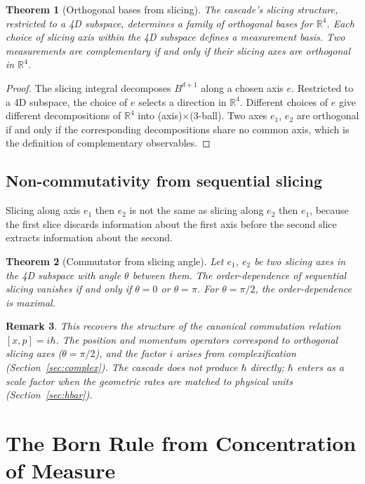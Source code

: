 \documentclass[12pt,a4paper]{article}
\newtheorem{theorem}{Theorem}[section]
\newtheorem{remark}[theorem]{Remark}
\begin{document}
\begin{theorem}[Orthogonal bases from slicing]\label{thm:bases}
The cascade's slicing structure, restricted to a 4D subspace, determines a family of
orthogonal bases for $\mathbb{R}^4$. Each choice of slicing axis within the 4D subspace
defines a measurement basis. Two measurements are complementary if and only if their slicing
axes are orthogonal in $\mathbb{R}^4$.
\end{theorem}
\begin{proof}
The slicing integral decomposes $B^{d+1}$ along a chosen axis $e$. Restricted to a 4D
subspace, the choice of $e$ selects a direction in $\mathbb{R}^4$. Different choices of $e$
give different decompositions of $\mathbb{R}^4$ into (axis)$\times$(3-ball). Two axes $e_1$,
$e_2$ are orthogonal if and only if the corresponding decompositions share no common axis,
which is the definition of complementary observables.
\end{proof}

\subsection{Non-commutativity from sequential slicing}

Slicing along axis $e_1$ then $e_2$ is not the same as slicing along $e_2$ then $e_1$,
because the first slice discards information about the first axis before the second slice
extracts information about the second.

\begin{theorem}[Commutator from slicing angle]\label{thm:commutator}
Let $e_1$, $e_2$ be two slicing axes in the 4D subspace with angle $\theta$ between them.
The order-dependence of sequential slicing vanishes if and only if $\theta=0$ or $\theta=\pi$.
For $\theta=\pi/2$, the order-dependence is maximal.
\end{theorem}

\begin{remark}
This recovers the structure of the canonical commutation relation $[x,p]=i\hbar$. The
position and momentum operators correspond to orthogonal slicing axes ($\theta=\pi/2$), and
the factor $i$ arises from complexification (Section~\ref{sec:complex}). The cascade does
not produce $\hbar$ directly; $\hbar$ enters as a scale factor when the geometric rates are
matched to physical units (Section~\ref{sec:hbar}).
\end{remark}

\section{The Born Rule from Concentration of Measure}
\end{document}
